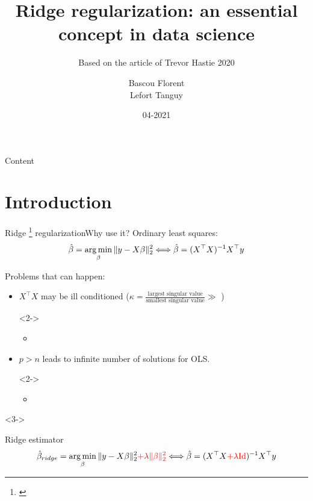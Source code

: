 \documentclass[10pt,aspectratio=43]{beamer}
\title[] %
{Ridge regularization: an essential concept in data science} %
\subtitle{Based on the article of Trevor Hastie 2020}
\date{04-2021} %
\author[]%
{%
    {Bascou Florent} \\%
	{Lefort Tanguy}%
}
\institute[
]
{%
    University of Montpellier
}
\begin{document}
\maketitle


\begin{frame}{Content}{}
    \tableofcontents
\end{frame}

\section*{Introduction}

\begin{frame}{Ridge \footnote[frame]{\citet{Tikhonov43,Hoerl_Kennard70}} regularization}{Why use it?}
    Ordinary least squares:
    \[\hat\beta = \mathop{\mathrm{arg\,min}}_{\beta} \|y-X\beta\|_2^2 \Longleftrightarrow \hat \beta = (X^\top X)^{-1}X^\top y\]

    Problems that can happen:
    \begin{itemize}
        \item $X^\top X$ may be ill conditioned ($\kappa = \frac{\text{largest singular value}}{\text{smallest singular value}} \gg $ )
        \begin{onlyenv}<2->
            \begin{itemize}
                \item {}
            \end{itemize}
        \end{onlyenv}
        \item $p > n$ leads to infinite number of solutions for OLS.
        \begin{onlyenv}<2->
            \begin{itemize}
                \item \color{red}{ Add penalty to recover unicity.}
            \end{itemize}
        \end{onlyenv}
    \end{itemize}
    \begin{onlyenv}<3->
    \begin{block}{Ridge estimator}
        \[ \hat\beta_{ridge} = \mathop{\mathrm{arg\,min}}_{\beta} \|y-X\beta\|_2^2 \textcolor{red}{+ \lambda \|\beta\|^2_2} \Longleftrightarrow \hat \beta = (X^\top X \textcolor{red}{+ \lambda \mathrm{Id}})^{-1}X^\top y \]
    \end{block}
    \end{onlyenv}
\end{frame}
\end{document}
